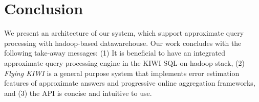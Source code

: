 \documentclass{sig-alternate-05-2015}
\begin{document}
\section{Conclusion}
We present an architecture of our  system, which support approximate query processing with hadoop-based datawarehouse.
Our work concludes with the following take-away messages:
(1) It is beneficial to have an integrated approximate query processing engine in the KIWI SQL-on-hadoop stack,
(2) \textit{Flying KIWI} is a general purpose system that implements error estimation features of approximate answers and progressive online aggregation frameworks, and
(3) the API is concise and intuitive to use.


















































\small{


}
\end{document}
